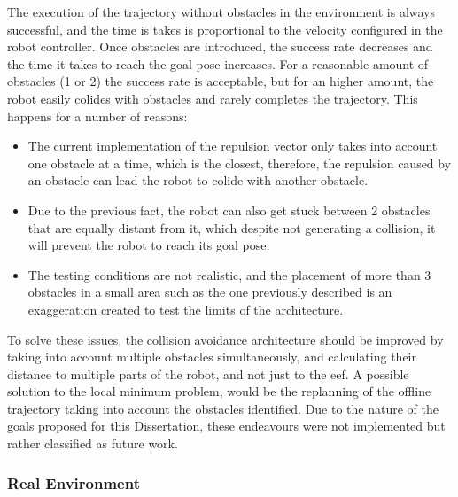 \par The execution of the trajectory without obstacles in the environment is always successful, and the time is takes is proportional to the velocity configured in the robot controller. Once obstacles are introduced, the success rate decreases and the time it takes to reach the goal pose increases. For a reasonable amount of obstacles (1 or 2) the success rate is acceptable, but for an higher amount, the robot easily colides with obstacles and rarely completes the trajectory. This happens for a number of reasons:

\begin{itemize}
    \item The current implementation of the repulsion vector only takes into account one obstacle at a time, which is the closest, therefore, the repulsion caused by an obstacle can lead the robot to colide with another obstacle.
    \item Due to the previous fact, the robot can also get stuck between 2 obstacles that are equally distant from it, which despite not generating a collision, it will prevent the robot to reach its goal pose.
    \item The testing conditions are not realistic, and the placement of more than 3 obstacles in a small area such as the one previously described is an exaggeration created to test the limits of the architecture.
\end{itemize}


\par To solve these issues, the collision avoidance architecture should be improved by taking into account multiple obstacles simultaneously, and calculating their distance to multiple parts of the robot, and not just to the \ac{eef}. A possible solution to the local minimum problem, would be the replanning of the offline trajectory taking into account the obstacles identified. Due to the nature of the goals proposed for this Dissertation, these endeavours were not implemented but rather classified as future work.



\subsubsection{Real Environment}

